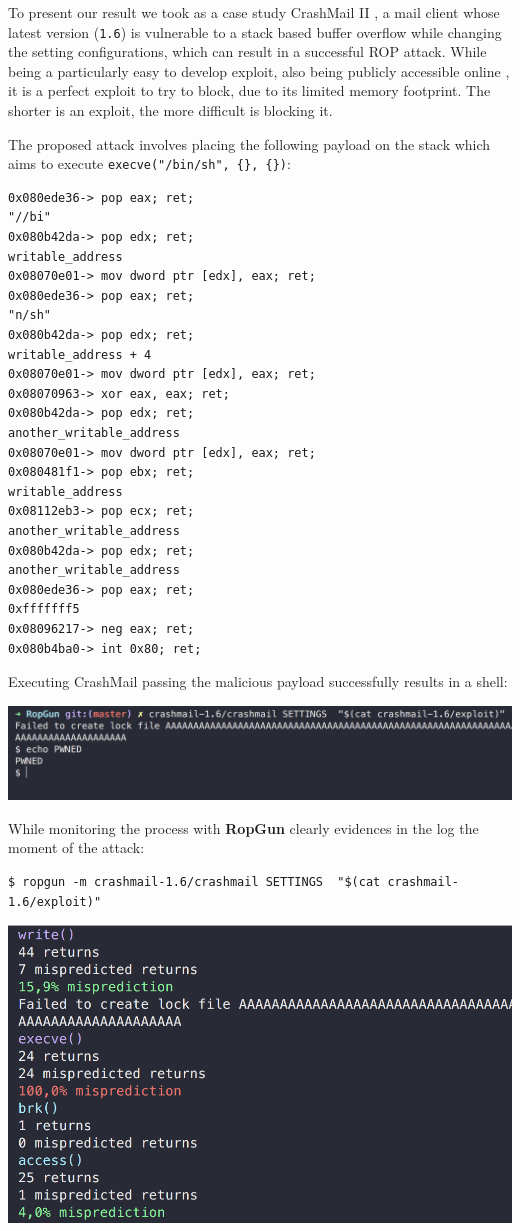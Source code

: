 \documentclass[11pt]{article}
\begin{document}
To present our result we took as a case study CrashMail II \cite{crashmail}, a mail client whose latest version ({\tt 1.6}) is vulnerable to a stack based buffer overflow while changing the setting configurations, which can result in a successful ROP attack. While being a particularly easy to develop exploit, also being publicly accessible online \cite{exploit}, it is a perfect exploit to try to block, due to its limited memory footprint. The shorter is an exploit, the more difficult is blocking it.

The proposed attack involves placing the following payload on the stack which aims to execute {\tt execve("/bin/sh", \{\}, \{\})}:

\bigskip
\begin{verbatim}
0x080ede36-> pop eax; ret;
"//bi"
0x080b42da-> pop edx; ret;
writable_address
0x08070e01-> mov dword ptr [edx], eax; ret;
0x080ede36-> pop eax; ret;
"n/sh"
0x080b42da-> pop edx; ret;
writable_address + 4
0x08070e01-> mov dword ptr [edx], eax; ret;
0x08070963-> xor eax, eax; ret;
0x080b42da-> pop edx; ret;
another_writable_address
0x08070e01-> mov dword ptr [edx], eax; ret;
0x080481f1-> pop ebx; ret;
writable_address
0x08112eb3-> pop ecx; ret;
another_writable_address
0x080b42da-> pop edx; ret;
another_writable_address
0x080ede36-> pop eax; ret;
0xfffffff5
0x08096217-> neg eax; ret;
0x080b4ba0-> int 0x80; ret;
\end{verbatim}

\bigskip
Executing CrashMail passing the malicious payload successfully results in a shell:

\begin{center}
  \includegraphics[width=0.9\linewidth]{exploit}
\end{center}

While monitoring the process with {\bf RopGun} clearly evidences in the log the moment of the attack:

\begin{verbatim}
$ ropgun -m crashmail-1.6/crashmail SETTINGS  "$(cat crashmail-1.6/exploit)"
\end{verbatim}

\begin{center}
  \includegraphics[width=0.9\linewidth]{monitor}
\end{center}
\end{document}
